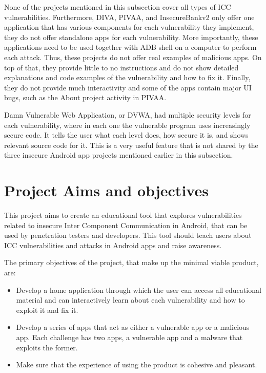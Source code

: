 		None of the projects mentioned in this subsection cover all types of ICC vulnerabilities. Furthermore, DIVA, PIVAA, and InsecureBankv2 only offer one application that has various components for each vulnerability they implement, they do not offer standalone apps for each vulnerability. More importantly, these applications need to be used together with ADB shell on a computer to perform each attack. Thus, these projects do not offer real examples of malicious apps. On top of that, they provide little to no instructions and do not show detailed explanations and code examples of the vulnerability and how to fix it. Finally, they do not provide much interactivity and some of the apps contain major UI bugs, such as the About project activity in PIVAA.
		
		Damn Vulnerable Web Application, or DVWA, had multiple security levels for each vulnerability, where in each one the vulnerable program uses increasingly secure code. It tells the user what each level does, how secure it is, and shows relevant source code for it. This is a very useful feature that is not shared by the three insecure Android app projects mentioned earlier in this subsection.
		
	\section{Project Aims and objectives}
		\label{sec:intro_objective} 
    	
    	This project aims to create an educational tool that explores vulnerabilities related to insecure Inter Component Communication in Android, that can be used by penetration testers and developers. This tool should teach users about ICC vulnerabilities and attacks in Android apps and raise awareness.
        
        The primary objectives of the project, that make up the minimal viable product, are:
        
        \begin{itemize}
            \item Develop a home application through which the user can access all educational material and can interactively learn about each vulnerability and how to exploit it and fix it.
            \item Develop a series of apps that act as either a vulnerable app or a malicious app. Each challenge has two apps, a vulnerable app and a malware that exploits the former.
            \item Make sure that the experience of using the product is cohesive and pleasant.
        \end{itemize}
	
